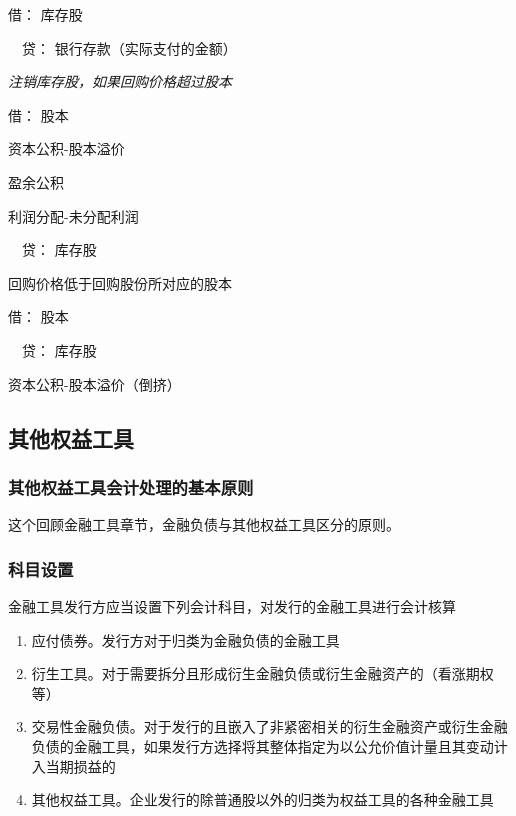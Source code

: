 \documentclass[UTF8,12pt]{ctexart}
\newenvironment{Dr}{\noindent 借：}{\par}
\newenvironment{Cr}{\noindent \ \ 贷：}{\par}
\numberwithin{equation}{section} %
\numberwithin{figure}{section}
\numberwithin{table}{section}
\begin{document}
	\begin{Dr}
		库存股
	\end{Dr}
	\begin{Cr}
		银行存款（实际支付的金额）
	\end{Cr}
	
	\textit{注销库存股，如果回购价格超过股本}
	
	\begin{Dr}
		股本
		
		资本公积-股本溢价
		
		盈余公积
		
		利润分配-未分配利润
	\end{Dr}
	\begin{Cr}
		库存股
	\end{Cr}

	回购价格低于回购股份所对应的股本
	
	\begin{Dr}
		股本
	\end{Dr}
	\begin{Cr}
		库存股
		
		资本公积-股本溢价（倒挤）
	\end{Cr}
	
	\subsection{其他权益工具}
	
	\subsubsection{其他权益工具会计处理的基本原则}
	这个回顾金融工具章节，金融负债与其他权益工具区分的原则。
	
	\subsubsection{科目设置}
	金融工具发行方应当设置下列会计科目，对发行的金融工具进行会计核算
	\begin{enumerate}
		\item 应付债券。发行方对于归类为金融负债的金融工具
		
		\item 衍生工具。对于需要拆分且形成衍生金融负债或衍生金融资产的（看涨期权等）
		
		\item 交易性金融负债。对于发行的且嵌入了非紧密相关的衍生金融资产或衍生金融负债的金融工具，如果发行方选择将其整体指定为以公允价值计量且其变动计入当期损益的
		
		\item 其他权益工具。企业发行的除普通股以外的归类为权益工具的各种金融工具
	\end{enumerate}
	
\end{document}
